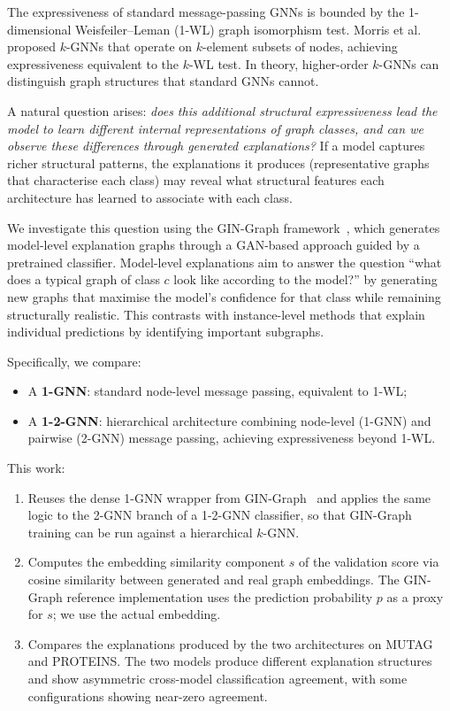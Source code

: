 \documentclass[12pt,a4paper]{article}
\begin{document}
The expressiveness of standard message-passing GNNs is bounded by the 1-dimensional Weisfeiler--Leman (1-WL) graph isomorphism test. Morris et al.~\cite{morris2019weisfeiler} proposed $k$-GNNs that operate on $k$-element subsets of nodes, achieving expressiveness equivalent to the $k$-WL test. In theory, higher-order $k$-GNNs can distinguish graph structures that standard GNNs cannot.

A natural question arises: \emph{does this additional structural expressiveness lead the model to learn different internal representations of graph classes, and can we observe these differences through generated explanations?} If a model captures richer structural patterns, the explanations it produces (representative graphs that characterise each class) may reveal what structural features each architecture has learned to associate with each class.

We investigate this question using the GIN-Graph framework~\cite{sun2025gingraph}, which generates model-level explanation graphs through a GAN-based approach guided by a pretrained classifier. Model-level explanations aim to answer the question ``what does a typical graph of class $c$ look like according to the model?'' by generating new graphs that maximise the model's confidence for that class while remaining structurally realistic. This contrasts with instance-level methods that explain individual predictions by identifying important subgraphs.

Specifically, we compare:
\begin{itemize}[nosep]
  \item A \textbf{1-GNN}: standard node-level message passing, equivalent to 1-WL;
  \item A \textbf{1-2-GNN}: hierarchical architecture combining node-level (1-GNN) and pairwise (2-GNN) message passing, achieving expressiveness beyond 1-WL.
\end{itemize}

This work:
\begin{enumerate}[nosep]
  \item Reuses the dense 1-GNN wrapper from GIN-Graph~\cite{sun2025gingraph} and applies the same logic to the 2-GNN branch of a 1-2-GNN classifier, so that GIN-Graph training can be run against a hierarchical $k$-GNN.
  \item Computes the embedding similarity component $s$ of the validation score via cosine similarity between generated and real graph embeddings. The GIN-Graph reference implementation uses the prediction probability $p$ as a proxy for $s$; we use the actual embedding.
  \item Compares the explanations produced by the two architectures on MUTAG and PROTEINS. The two models produce different explanation structures and show asymmetric cross-model classification agreement, with some configurations showing near-zero agreement.
\end{enumerate}
\end{document}

